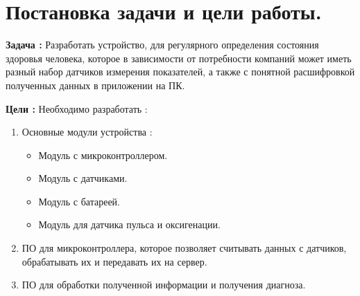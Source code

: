 \documentclass[a4document]{article}
\begin{document}
{
\newpage
\section*{Постановка задачи и цели работы.} 

\par\noindent
\textbf{Задача :}
\newline
Разработать устройство, для регулярного определения состояния здоровья человека, 
которое в зависимости от потребности компаний может иметь разный набор датчиков измерения показателей,
а также с понятной расшифровкой полученных данных в приложении на ПК. 

\bigbreak
\par\noindent
\textbf{Цели :}
\newline
Необходимо разработать : 
\begin{enumerate}
    \item Основные модули устройства : 
    \begin{itemize}
        \item Модуль с микроконтроллером.
        \item Модуль с датчиками. 
        \item Модуль с батареей.
        \item Модуль для датчика пульса и оксигенации.
    \end{itemize}
    \item ПО для микроконтроллера, которое позволяет считывать данных с датчиков, обрабатывать их и передавать их на сервер.
    \item ПО для обработки полученной информации и получения диагноза.
\end{enumerate}

}
\end{document}
